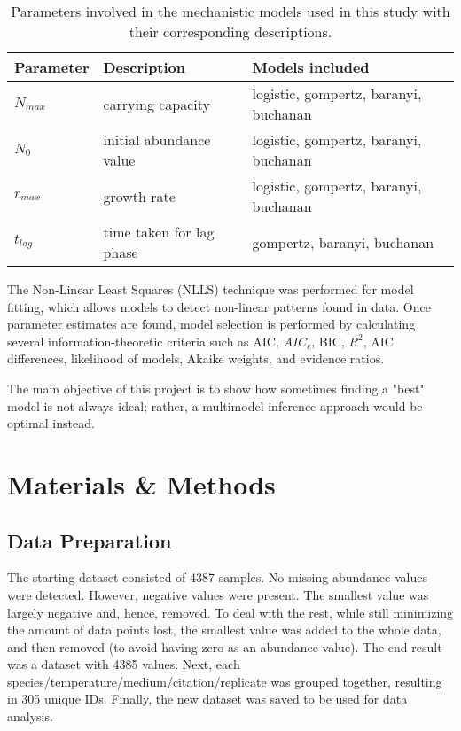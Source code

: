 \documentclass[11pt]{article}
\begin{document}
\begin{linenumbers}
	\begin{table}[ht]
		\centering
		\begin{tabular}{|l|l|l|}
			\hline
			Parameter & Description              & Models included                       \\ \hline\hline
			$N_{max}$ & carrying capacity        & logistic, gompertz, baranyi, buchanan \\ \hline
			$N_0$     & initial abundance value  & logistic, gompertz, baranyi, buchanan \\ \hline
			$r_{max}$ & growth rate              & logistic, gompertz, baranyi, buchanan \\ \hline
			$t_{lag}$ & time taken for lag phase & gompertz, baranyi, buchanan           \\ \hline
		\end{tabular}
		\caption{Parameters involved in the mechanistic models used in this study with their corresponding descriptions.}
		\label{tab:parameters}
	\end{table}

	\par The Non-Linear Least Squares (NLLS) technique was performed for model fitting, which allows models to detect non-linear patterns found in data. Once parameter estimates are found, model selection is performed by calculating several information-theoretic criteria such as AIC, $AIC_c$, BIC, $R^2$, AIC differences, likelihood of models, Akaike weights, and evidence ratios.
	\par The main objective of this project is to show how sometimes finding a "best" model is not always ideal; rather, a multimodel inference approach would be optimal instead.

	\section{Materials \& Methods}
	\subsection{Data Preparation}
	The starting dataset consisted of 4387 samples. No missing abundance values were detected. However, negative values were present. The smallest value was largely negative and, hence, removed. To deal with the rest, while still minimizing the amount of data points lost, the smallest value was added to the whole data, and then removed (to avoid having zero as an abundance value). The end result was a dataset with 4385 values.
	Next, each species/temperature/medium/citation/replicate was grouped together, resulting in 305 unique IDs. Finally, the new dataset was saved to be used for data analysis.


\end{linenumbers}
\end{document}
